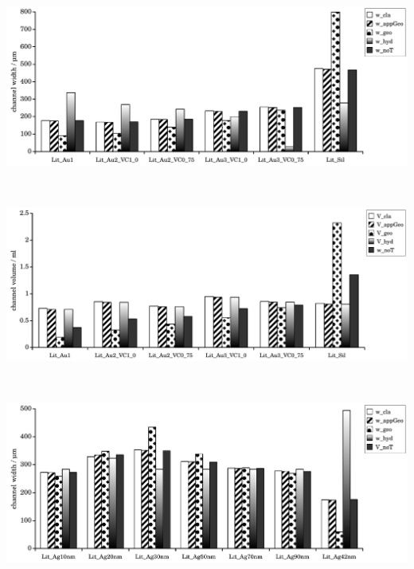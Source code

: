 \begin{minipage}{\linewidth}
\centering
    \begin{minipage}{.75\linewidth}
      \includegraphics[width=\linewidth]{./images/data/eval_lit_p8/Lit1Data_w_8p.pdf}
    \end{minipage}\\
    \begin{minipage}{.75\linewidth}
      \includegraphics[width=\linewidth]{./images/data/eval_lit_p8/Lit1Data_V_8p.pdf}
    \end{minipage}\\
    \begin{minipage}{.75\linewidth}
      \includegraphics[width=\linewidth]{./images/data/eval_lit_p8/Lit2Data_w_8p.pdf}
    \end{minipage}\\

\end{minipage}
